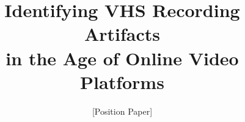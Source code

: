 \documentclass{sig-alternate}
\begin{document}
%
\crdata{}  %

\title{Identifying VHS Recording Artifacts\\
in the Age of Online Video Platforms}
\subtitle{[Position Paper]
}
%
%
%
%
%
\end{document}
